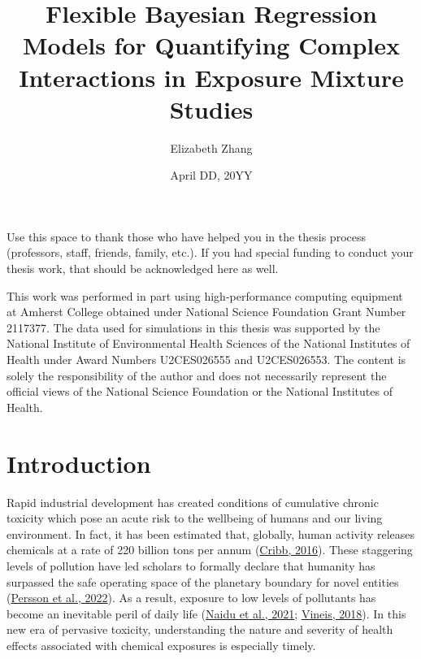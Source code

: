 \documentclass[12pt, twoside]{amherstthesis}
\title{Flexible Bayesian Regression Models for Quantifying Complex Interactions in Exposure Mixture Studies}
\author{Elizabeth Zhang}
\date{April DD, 20YY}
\begin{document}
\doublespace
  \maketitle

\frontmatter %
\pagestyle{fancyplain}



  \begin{acknowledgments}
    Use this space to thank those who have helped you in the thesis process (professors, staff, friends, family, etc.). If you had special funding to conduct your thesis work, that should be acknowledged here as well.

    This work was performed in part using high-performance computing equipment at Amherst College obtained under National Science Foundation Grant Number 2117377. The data used for simulations in this thesis was supported by the National Institute of Environmental Health Sciences of the National Institutes of Health under Award Numbers U2CES026555 and U2CES026553. The content is solely the responsibility of the author and does not necessarily represent the official views of the National Science Foundation or the National Institutes of Health.
  \end{acknowledgments}

  \hypersetup{linkcolor=black}
  \setcounter{tocdepth}{2}
  \tableofcontents

  \listoftables

  \listoffigures


\mainmatter %
\pagestyle{fancyplain} %

\hypertarget{intro}{%
\chapter{Introduction}\label{intro}}

Rapid industrial development has created conditions of cumulative chronic toxicity which pose an acute risk to the wellbeing of humans and our living environment. In fact, it has been estimated that, globally, human activity releases chemicals at a rate of 220 billion tons per annum (\protect\hyperlink{ref-cribb_surviving_2016}{Cribb, 2016}). These staggering levels of pollution have led scholars to formally declare that humanity has surpassed the safe operating space of the planetary boundary for novel entities (\protect\hyperlink{ref-persson_outside_2022}{Persson et al., 2022}). As a result, exposure to low levels of pollutants has become an inevitable peril of daily life (\protect\hyperlink{ref-naidu_chemical_2021}{Naidu et al., 2021}; \protect\hyperlink{ref-vineis_john_2018}{Vineis, 2018}). In this new era of pervasive toxicity, understanding the nature and severity of health effects associated with chemical exposures is especially timely.
\end{document}
